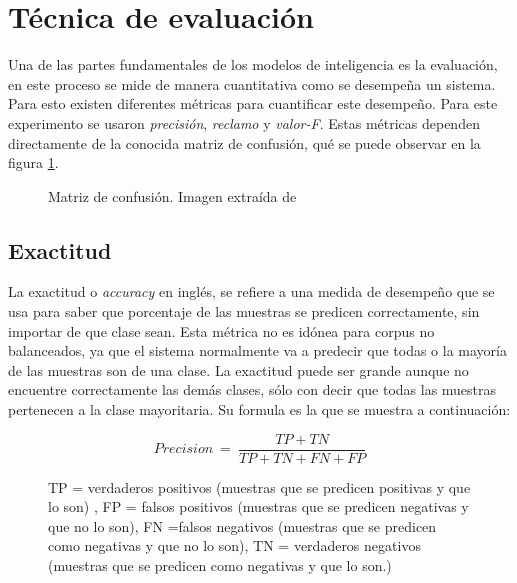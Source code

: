 \section{Técnica de evaluación}

\par Una de las partes fundamentales de los modelos de inteligencia es la evaluación, en este proceso se mide de manera cuantitativa como se desempeña un sistema. Para esto existen diferentes métricas para cuantificar este desempeño. Para este experimento se usaron \textit{precisión}, \textit{reclamo} y \textit{valor-F}. Estas métricas dependen directamente de la conocida matriz de confusión, qué se puede observar en la figura \ref{fig:confMat}. 

\begin{figure}[h]
	\centering
	
	\caption{Matriz de confusión. Imagen extraída de \textcite{fawcett2006introduction}}
	\label{fig:confMat}
\end{figure}

\subsection{Exactitud}

\par La \gls{exactitud} o \textit{accuracy} en inglés, se refiere a una medida de desempeño que se usa para saber que porcentaje de las muestras se predicen correctamente, sin importar de que clase sean. Esta métrica no es idónea para corpus no balanceados, ya que el sistema normalmente va a predecir que todas o la mayoría de las muestras son de una clase. La exactitud puede ser grande aunque no encuentre correctamente las demás clases, sólo con decir que todas las muestras pertenecen a la clase mayoritaria. Su formula es la que se muestra a continuación:
\begin{figure}[H]
	\centering
	\begin{equation*}
		Precision\ =\ \frac{TP+TN}{TP+TN+FN+FP}
	\end{equation*}
	\caption*{TP = verdaderos positivos (muestras que se predicen positivas y que lo son) , FP = falsos positivos (muestras que se predicen negativas y que no lo son), FN =falsos negativos (muestras que se predicen como negativas y que no lo son), TN = verdaderos negativos (muestras que se predicen como negativas y que lo son.)}
\end{figure}

